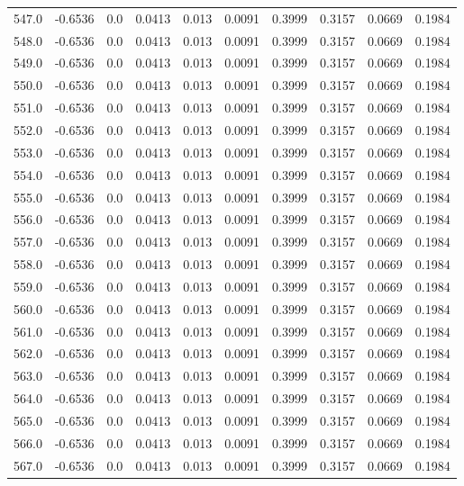 \begin{longtable}{lrrrrrrrrr}
547.0 & -0.6536 & 0.0 & 0.0413 & 0.013 & 0.0091 & 0.3999 & 0.3157 & 0.0669 & 0.1984 \\
548.0 & -0.6536 & 0.0 & 0.0413 & 0.013 & 0.0091 & 0.3999 & 0.3157 & 0.0669 & 0.1984 \\
549.0 & -0.6536 & 0.0 & 0.0413 & 0.013 & 0.0091 & 0.3999 & 0.3157 & 0.0669 & 0.1984 \\
550.0 & -0.6536 & 0.0 & 0.0413 & 0.013 & 0.0091 & 0.3999 & 0.3157 & 0.0669 & 0.1984 \\
551.0 & -0.6536 & 0.0 & 0.0413 & 0.013 & 0.0091 & 0.3999 & 0.3157 & 0.0669 & 0.1984 \\
552.0 & -0.6536 & 0.0 & 0.0413 & 0.013 & 0.0091 & 0.3999 & 0.3157 & 0.0669 & 0.1984 \\
553.0 & -0.6536 & 0.0 & 0.0413 & 0.013 & 0.0091 & 0.3999 & 0.3157 & 0.0669 & 0.1984 \\
554.0 & -0.6536 & 0.0 & 0.0413 & 0.013 & 0.0091 & 0.3999 & 0.3157 & 0.0669 & 0.1984 \\
555.0 & -0.6536 & 0.0 & 0.0413 & 0.013 & 0.0091 & 0.3999 & 0.3157 & 0.0669 & 0.1984 \\
556.0 & -0.6536 & 0.0 & 0.0413 & 0.013 & 0.0091 & 0.3999 & 0.3157 & 0.0669 & 0.1984 \\
557.0 & -0.6536 & 0.0 & 0.0413 & 0.013 & 0.0091 & 0.3999 & 0.3157 & 0.0669 & 0.1984 \\
558.0 & -0.6536 & 0.0 & 0.0413 & 0.013 & 0.0091 & 0.3999 & 0.3157 & 0.0669 & 0.1984 \\
559.0 & -0.6536 & 0.0 & 0.0413 & 0.013 & 0.0091 & 0.3999 & 0.3157 & 0.0669 & 0.1984 \\
560.0 & -0.6536 & 0.0 & 0.0413 & 0.013 & 0.0091 & 0.3999 & 0.3157 & 0.0669 & 0.1984 \\
561.0 & -0.6536 & 0.0 & 0.0413 & 0.013 & 0.0091 & 0.3999 & 0.3157 & 0.0669 & 0.1984 \\
562.0 & -0.6536 & 0.0 & 0.0413 & 0.013 & 0.0091 & 0.3999 & 0.3157 & 0.0669 & 0.1984 \\
563.0 & -0.6536 & 0.0 & 0.0413 & 0.013 & 0.0091 & 0.3999 & 0.3157 & 0.0669 & 0.1984 \\
564.0 & -0.6536 & 0.0 & 0.0413 & 0.013 & 0.0091 & 0.3999 & 0.3157 & 0.0669 & 0.1984 \\
565.0 & -0.6536 & 0.0 & 0.0413 & 0.013 & 0.0091 & 0.3999 & 0.3157 & 0.0669 & 0.1984 \\
566.0 & -0.6536 & 0.0 & 0.0413 & 0.013 & 0.0091 & 0.3999 & 0.3157 & 0.0669 & 0.1984 \\
567.0 & -0.6536 & 0.0 & 0.0413 & 0.013 & 0.0091 & 0.3999 & 0.3157 & 0.0669 & 0.1984 \\

\end{longtable}
